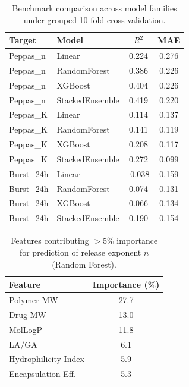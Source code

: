 
\begin{table}[ht]
\centering
\caption{Benchmark comparison across model families under grouped 10-fold cross-validation.}
\label{tab:benchmarking}
\begin{tabular}{llcc}
\toprule
Target & Model & $R^2$ & MAE \\
\midrule
Peppas\_n & Linear & 0.224 & 0.276 \\
Peppas\_n & RandomForest & 0.386 & 0.226 \\
Peppas\_n & XGBoost & 0.404 & 0.226 \\
Peppas\_n & StackedEnsemble & 0.419 & 0.220 \\
\midrule
Peppas\_K & Linear & 0.114 & 0.137 \\
Peppas\_K & RandomForest & 0.141 & 0.119 \\
Peppas\_K & XGBoost & 0.208 & 0.117 \\
Peppas\_K & StackedEnsemble & 0.272 & 0.099 \\
\midrule
Burst\_24h & Linear & -0.038 & 0.159 \\
Burst\_24h & RandomForest & 0.074 & 0.131 \\
Burst\_24h & XGBoost & 0.066 & 0.134 \\
Burst\_24h & StackedEnsemble & 0.190 & 0.154 \\
\bottomrule
\end{tabular}
\end{table}


\begin{table}[ht]
\centering
\caption{Features contributing $>$5\% importance for prediction of release exponent $n$ (Random Forest).}
\label{tab:feature_importance}
\begin{tabular}{lc}
\toprule
Feature & Importance (\%) \\
\midrule
Polymer MW & 27.7 \\
Drug MW & 13.0 \\
MolLogP & 11.8 \\
LA/GA & 6.1 \\
Hydrophilicity Index & 5.9 \\
Encapsulation Eff. & 5.3 \\
\bottomrule
\end{tabular}
\end{table}

